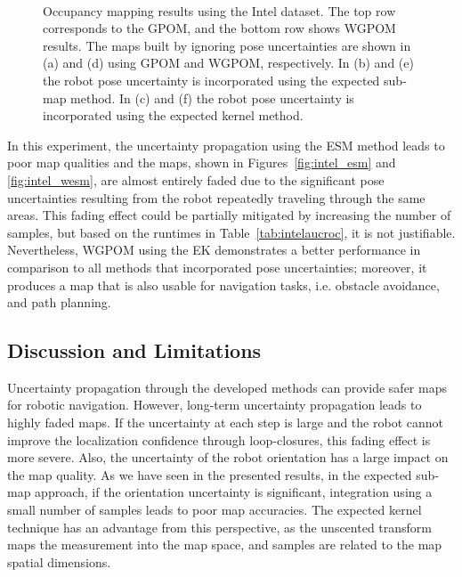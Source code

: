 \documentclass[letterpaper, 10 pt, journal, twoside]{IEEEtran}  %
\begin{document}
\begin{figure*}
  \centering  
  \\
  \caption{Occupancy mapping results using the Intel dataset. The top row corresponds to the GPOM, and the bottom row shows WGPOM results. The maps built by ignoring pose uncertainties are shown in (a) and (d) using GPOM and WGPOM, respectively.  In (b) and (e) the robot pose uncertainty is incorporated using the expected sub-map method. In (c) and (f) the robot pose uncertainty is incorporated using the expected kernel method.}
  \label{fig:Intel_warp}
\end{figure*}

In this experiment, the uncertainty propagation using the ESM method leads to poor map qualities and the maps, shown in Figures~\ref{fig:intel_esm} and \ref{fig:intel_wesm}, are almost entirely faded due to the significant pose uncertainties resulting from the robot repeatedly traveling through the same areas. This fading effect could be partially mitigated by increasing the number of samples, but based on the runtimes in Table~\ref{tab:intelaucroc}, it is not justifiable. Nevertheless, WGPOM using the EK demonstrates a better performance in comparison to all methods that incorporated pose uncertainties; moreover, it produces a map that is also usable for navigation tasks, i.e. obstacle avoidance, and path planning.

\subsection{Discussion and Limitations}
\label{subsec:wmaplimit}
Uncertainty propagation through the developed methods can provide safer maps for robotic navigation. However, long-term uncertainty propagation leads to highly faded maps. If the uncertainty at each step is large and the robot cannot improve the localization confidence through loop-closures, this fading effect is more severe. Also, the uncertainty of the robot orientation has a large impact on the map quality. As we have seen in the presented results, in the expected sub-map approach, if the orientation uncertainty is significant, integration using a small number of samples leads to poor map accuracies. The expected kernel technique has an advantage from this perspective, as the unscented transform maps the measurement into the map space, and samples are related to the map spatial dimensions.
\end{document}
